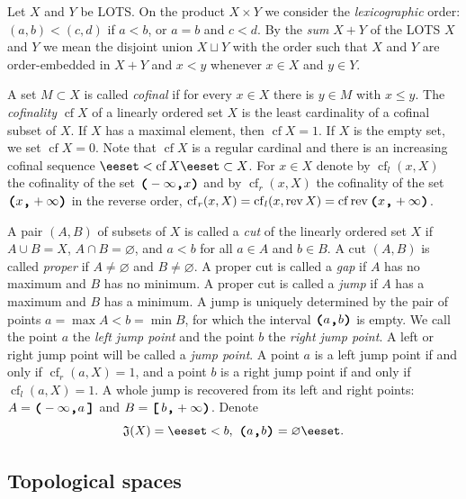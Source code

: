 \documentclass[preprint]{elsarticle}
\def\al{\alpha}
\def\es{\varnothing}
\def\set#1{\bbset#1\eeset}
\def\bbset#1:#2\eeset{\{#1\,:\,#2\}}
\def\term#1{{\it #1}}
\theoremstyle{definition}
\theoremstyle{remark}
\def\cf{\operatorname{cf}}
\def\rev{\operatorname{rev}}
\def\lL(#1,#2){(-\infty,#1)}
\def\lR(#1,#2){(#1,+\infty)}
\def\ilcomma/{\boldsymbol{,}}
\def\ilsymlp{\boldsymbol{(}}
\def\ilsymrp{\boldsymbol{)}}
\def\ilsymlc{\boldsymbol{[}}
\def\ilsymrc{\boldsymbol{]}}
\def\ilfont#1{\boldsymbol{#1}}
\def\ilfontX#1{\mathrm{\text{\texttt{\textbf{\large #1}}}}}
\def\ilfontX#1{{\text{\texttt{\textbf{\large \upshape #1}}}}}
\def\ilfont#1{\raisebox{-1.2pt}{\ilfontX{#1}}}
\def\ilfontC#1{\raisebox{-0.7pt}{\ilfontX{#1}}}
\def\ilcomma/{\ilfontC{,}}
\def\ilsymlp{\ilfont{(}}
\def\ilsymrp{\ilfont{)}}
\def\ilsymlc{\ilfont{[}\,}
\def\ilsymrc{\,\ilfont{]}}
\def\ilpp(#1,#2){\ilsymlp#1\ilcomma/ #2\ilsymrp}
\def\ilcp[#1,#2){\ilsymlc#1\ilcomma/ #2\ilsymrp}
\def\ilpc(#1,#2]{\ilsymlp#1\ilcomma/ #2\ilsymrc}
\def\lL(#1,#2){\ilpp(-\infty, #1)}
\def\lR(#1,#2){\ilpp(#1, +\infty)}
\def\jumps#1{\mathfrak{J}(#1)}
\begin{document}
Let $X$ and $Y$ be LOTS. On the product $X\times Y$ we consider the \term{lexicographic} order: $(a,b)<(c,d)$ if $a<b$, or $a=b$ and $c<d$. By the \term{sum} $X+Y$ of the LOTS $X$ and $Y$ we mean the disjoint union $X \sqcup Y$ with the order such that $X$ and $Y$ are order-embedded in $X+Y$ and $x<y$ whenever $x\in X$ and $y\in Y$.




A set $M\subset X$ is called \term{cofinal} if for every $x\in X$ there is $y\in M$ with $x\leq y$.
The \term{cofinality} $\cf X$ of a linearly ordered set $X$ is the least cardinality of a cofinal subset of $X$. If $X$ has a maximal element, then $\cf X=1$. If $X$ is the empty set, we set $\cf X=0$.
Note that $\cf X$ is a regular cardinal and there is an increasing cofinal sequence $\set{x_\al:\al < \cf X}\subset X$.
For $x\in X$ denote by $\cf_l(x,X)$ the cofinality of the set
$\lL(x,X)$  
and by $\cf_r(x,X)$ the cofinality of the set
$\lR(x,X)$  
in the reverse order, $\cf_r(x,X) = \cf_l(x,\rev X)=\cf\rev \lR(x,X)$.

A pair $(A,B)$ of subsets of $X$ is called a \term{cut} of the linearly ordered set $X$ if $A\cup B=X$, $A\cap B=\es$, and $a<b$ for all $a\in A$ and $b\in B$. A cut $(A,B)$ is called \term{proper} if $A\neq\es$ and $B\neq\es$. A proper cut is called a \term{gap} if $A$ has no maximum and $B$ has no minimum. A proper cut is called a \term{jump} if $A$ has a maximum and $B$ has a minimum. A jump is uniquely determined by the pair of points $a=\max A<b=\min B$, for which the interval $\ilpp(a,b)$ is empty. We call the point $a$ the \term{left jump point} and the point $b$ the \term{right jump point}. A left or right jump point will be called a \term{jump point}. A point $a$ is a left jump point if and only if $\cf_r(a,X)=1$, and a point $b$ is a right jump point if and only if $\cf_l(a,X)=1$. A whole jump is recovered from its left and right points: 
$A=\ilpc(-\infty,a]$ and $B=\ilcp[b,+\infty)$.
Denote 
\[
\jumps X = \set{(a,b)\in X\times X:  a<b,\   \ilpp(a,b)=\es}.
\]

\subsection{Topological spaces}
\end{document}
